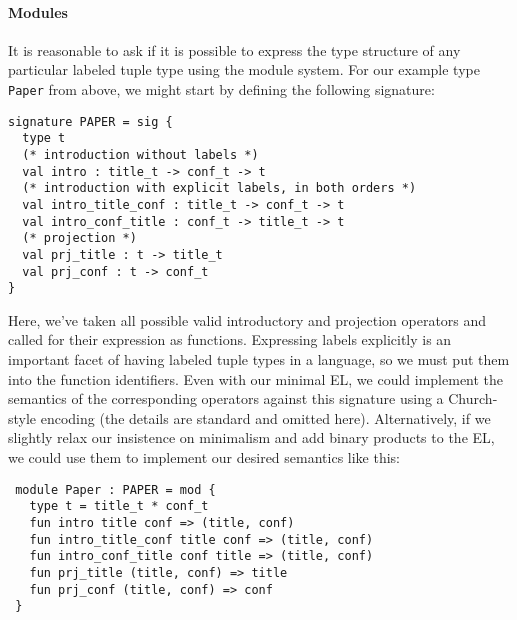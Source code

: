 \paragraph{Modules}
It is reasonable to ask if it is possible to express the type structure of any particular labeled tuple type using the module system.  %
For our example type \lstinline{Paper} from above, we might start by defining the following signature:
\begin{lstlisting}
signature PAPER = sig {
  type t
  (* introduction without labels *)
  val intro : title_t -> conf_t -> t
  (* introduction with explicit labels, in both orders *)
  val intro_title_conf : title_t -> conf_t -> t
  val intro_conf_title : conf_t -> title_t -> t
  (* projection *)
  val prj_title : t -> title_t
  val prj_conf : t -> conf_t
}
\end{lstlisting}
Here, we've taken all possible valid introductory and projection operators and called for their expression as functions. Expressing labels explicitly is an important facet of having labeled tuple types in a language, so we must put them into the function identifiers. Even with our minimal EL, we could  implement the semantics of the corresponding operators against this signature using a Church-style encoding (the details are standard and omitted here). Alternatively, if we slightly relax  our insistence on minimalism and add binary products to the EL, we could use them to implement our desired semantics like this:
\begin{lstlisting}
 module Paper : PAPER = mod {
   type t = title_t * conf_t
   fun intro title conf => (title, conf)
   fun intro_title_conf title conf => (title, conf)
   fun intro_conf_title conf title => (title, conf)
   fun prj_title (title, conf) => title 
   fun prj_conf (title, conf) => conf
 }
 \end{lstlisting}

